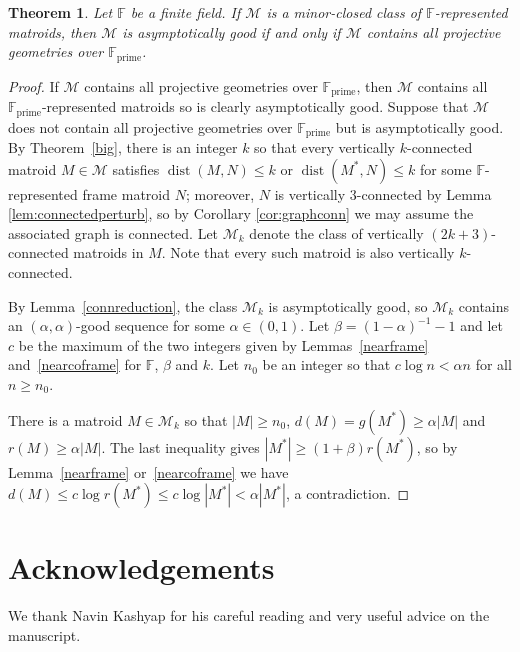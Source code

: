 \documentclass[12pt]{amsart}
\newtheorem{theorem}{Theorem}[section]
\theoremstyle{definition}
\newcommand{\bF}{\mathbb F}
\newcommand{\cM}{\mathcal{M}}
\newcommand{\Fprime}{\mathbb{F}_{\mathrm{prime}}}
\DeclareMathOperator{\dist}{dist}
\begin{document}
  \begin{theorem}
    Let $\bF$ be a finite field. If $\cM$ is a minor-closed class of $\bF$-represented matroids, then $\cM$ is asymptotically good if and only if $\cM$ contains all projective geometries over $\Fprime$.
  \end{theorem}
  \begin{proof}
    If $\cM$ contains all projective geometries over $\Fprime$, then $\cM$ contains all $\Fprime$-represented matroids so is clearly asymptotically good. Suppose that $\cM$ does not contain all projective geometries over $\Fprime$ but is asymptotically good. By Theorem~\ref{big}, there is an integer $k$ so that every vertically $k$-connected matroid $M \in \cM$ satisfies $\dist(M,N) \le k$ or $\dist(M^*,N) \le k$ for some $\bF$-represented frame matroid $N$; moreover, $N$ is vertically $3$-connected by Lemma \ref{lem:connectedperturb}, so by Corollary \ref{cor:graphconn} we may assume the associated graph is connected. Let $\cM_k$ denote the class of vertically $(2k+3)$-connected matroids in $M$. Note that every such matroid is also vertically $k$-connected. 
    
    
    By Lemma~\ref{connreduction}, the class $\cM_k$ is asymptotically good, so $\cM_k$ contains an $(\alpha,\alpha)$-good sequence for some $\alpha \in (0,1)$. Let $\beta = (1-\alpha)^{-1}-1$ and let $c$ be the maximum of the two integers given by Lemmas~\ref{nearframe} and~\ref{nearcoframe} for $\bF$, $\beta$ and $k$. Let $n_0$ be an integer so that $c \log n < \alpha n$ for all $n \ge n_0$. 
    
    There is a matroid $M \in \cM_k$ so that $|M| \ge n_0$, $d(M) = g(M^*) \ge \alpha|M|$ and $r(M) \ge \alpha|M|$. The last inequality gives $|M^*| \ge (1+\beta)r(M^*)$, so by Lemma~\ref{nearframe} or~\ref{nearcoframe} we have $d(M) \le c \log r(M^*) \le c \log |M^*| < \alpha |M^*|$, a contradiction. 
    
    
    
  \end{proof}
\section*{Acknowledgements}
	We thank Navin Kashyap for his careful reading and very useful advice on the manuscript. 
\end{document}
